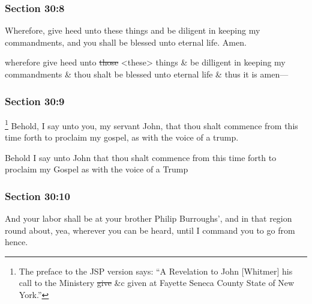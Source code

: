 	\subsubsection{Section 30:8} %
		\label{DC30-8}

		Wherefore, give heed unto these things and be diligent in keeping my commandments, and you shall be blessed unto eternal life.  Amen.

		\begin{framed}
		\scriptsize
			\begin{compactdesc}
				\item[JSP] wherefore give heed unto \sout{those} <these> things \& be dilligent in keeping my commandments \& thou shalt be blessed unto eternal life \& thus it is amen---
			\end{compactdesc}
		\end{framed}

	\subsubsection{Section 30:9} %
		\label{DC30-9}

			\footnote{%
				The preface to the JSP version says: ``A Revelation to John [Whitmer] his call to the Ministery \sout{give} \&c given at Fayette Seneca County State of New York.''
				}%
		Behold, I say unto you, my servant John, that thou shalt commence from this time forth to proclaim my gospel, as with the voice of a trump.

		\begin{framed}
		\scriptsize
			\begin{compactdesc}
				\item[JSP] Behold I say unto John that thou shalt commence from this time forth to proclaim my Gospel as with the voice of a Trump
			\end{compactdesc}
		\end{framed}

	\subsubsection{Section 30:10} %
		\label{DC30-10}

		And your labor shall be at your brother Philip Burroughs', and in that region round about, yea, wherever you can be heard, until I command you to go from hence.

